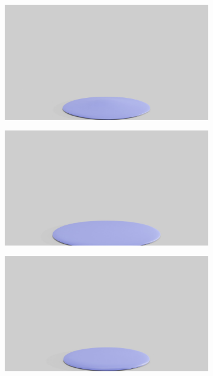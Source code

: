 \begin{figure}[htp!]
\begin{subfigure}{.16\linewidth}
		{\includegraphics[width=2.0\textwidth]{images/soft_ball/0495/0250.jpg}}
		\label{sfig:ball-0495-2}
	\end{subfigure}%
	\begin{subfigure}{.16\linewidth}
		\centering
		{\includegraphics[width=2.0\textwidth]{images/soft_ball/0495/0300.jpg}}
		\label{sfig:ball-0495-3}
	\end{subfigure}%
	\begin{subfigure}{.16\linewidth}
		\centering
		{\includegraphics[width=2.0\textwidth]{images/soft_ball/0495/0350.jpg}}

\end{subfigure}
\end{figure}
